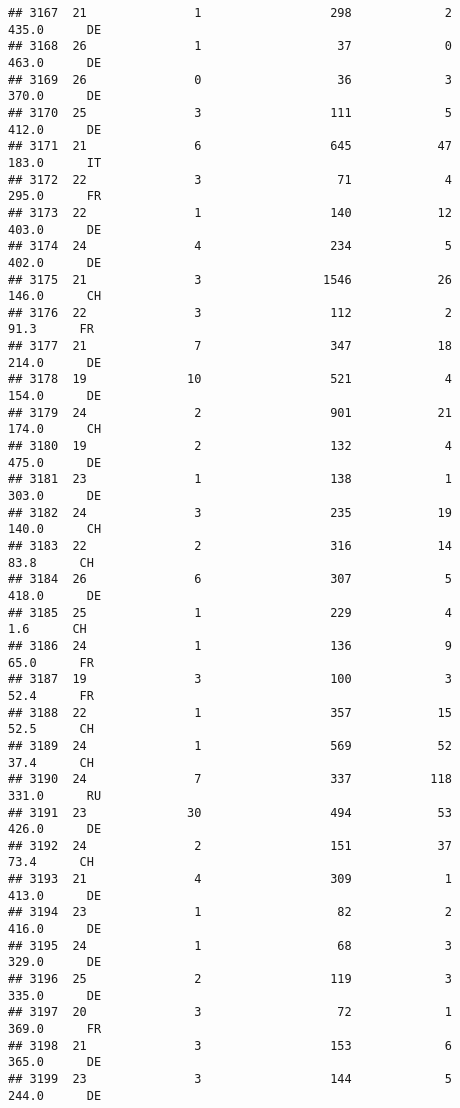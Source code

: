 \documentclass[
]{article}
\begin{document}
\begin{verbatim}
## 3167  21               1                  298             2    435.0      DE
## 3168  26               1                   37             0    463.0      DE
## 3169  26               0                   36             3    370.0      DE
## 3170  25               3                  111             5    412.0      DE
## 3171  21               6                  645            47    183.0      IT
## 3172  22               3                   71             4    295.0      FR
## 3173  22               1                  140            12    403.0      DE
## 3174  24               4                  234             5    402.0      DE
## 3175  21               3                 1546            26    146.0      CH
## 3176  22               3                  112             2     91.3      FR
## 3177  21               7                  347            18    214.0      DE
## 3178  19              10                  521             4    154.0      DE
## 3179  24               2                  901            21    174.0      CH
## 3180  19               2                  132             4    475.0      DE
## 3181  23               1                  138             1    303.0      DE
## 3182  24               3                  235            19    140.0      CH
## 3183  22               2                  316            14     83.8      CH
## 3184  26               6                  307             5    418.0      DE
## 3185  25               1                  229             4      1.6      CH
## 3186  24               1                  136             9     65.0      FR
## 3187  19               3                  100             3     52.4      FR
## 3188  22               1                  357            15     52.5      CH
## 3189  24               1                  569            52     37.4      CH
## 3190  24               7                  337           118    331.0      RU
## 3191  23              30                  494            53    426.0      DE
## 3192  24               2                  151            37     73.4      CH
## 3193  21               4                  309             1    413.0      DE
## 3194  23               1                   82             2    416.0      DE
## 3195  24               1                   68             3    329.0      DE
## 3196  25               2                  119             3    335.0      DE
## 3197  20               3                   72             1    369.0      FR
## 3198  21               3                  153             6    365.0      DE
## 3199  23               3                  144             5    244.0      DE

\end{verbatim}
\end{document}
